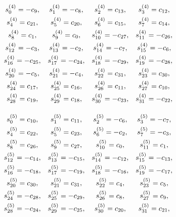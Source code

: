 \documentclass{jtacs}
\numberwithin{equation}{section}
\begin{document}
\begin{center}
\begin{adjustbox}{width=0.57\textwidth, margin=0 0 0 0}
$
\begin{array}{cccc}
\renewcommand*{\arraystretch}{1.5}
\begin{matrix}

s_{0}^{(4)}=-c_{9}, & 	s_{1}^{(4)}=-c_{8}, & 	s_{2}^{(4)}=c_{13}, & 	s_{3}^{(4)}=c_{12}, \\ 	s_{4}^{(4)}=c_{21}, & 	s_{5}^{(4)}=c_{20}, & 	s_{6}^{(4)}=c_{15}, & 	s_{7}^{(4)}=c_{14}, \\
s_{8}^{(4)}=c_{1}, & 	s_{9}^{(4)}=c_{0}, & 	s_{10}^{(4)}=-c_{27}, & 	s_{11}^{(4)}=-c_{26}, \\
s_{12}^{(4)}=-c_{3}, & 	s_{13}^{(4)}=-c_{2}, & 	s_{14}^{(4)}=-c_{7}, & 	s_{15}^{(4)}=-c_{6}, \\
s_{16}^{(4)}=-c_{25}, & 	s_{17}^{(4)}=-c_{24}, & 	s_{18}^{(4)}=-c_{29}, & 	s_{19}^{(4)}=-c_{28}, \\
s_{20}^{(4)}=-c_{5}, & 	s_{21}^{(4)}=-c_{4}, & 	s_{22}^{(4)}=c_{31}, & 	s_{23}^{(4)}=c_{30}, \\
s_{24}^{(4)}=c_{17}, & 	s_{25}^{(4)}=c_{16}, & 	s_{26}^{(4)}=c_{11}, & 	s_{27}^{(4)}=c_{10}, \\ 	s_{28}^{(4)}=c_{19}, & 	s_{29}^{(4)}=c_{18}, & 	s_{30}^{(4)}=-c_{23}, & 	s_{31}^{(4)}=-c_{22}, \\
\end{matrix}
\end{array}
$
\end{adjustbox}
\end{center}

\begin{center}
\begin{adjustbox}{width=0.57\textwidth, margin=0 0 0 0}
$
\begin{array}{cccc}
\renewcommand*{\arraystretch}{1.5}
\begin{matrix}
s_{0}^{(5)}=c_{10}, & 	s_{1}^{(5)}=c_{11}, & 	s_{2}^{(5)}=-c_{6}, & 	s_{3}^{(5)}=-c_{7}, \\ 	s_{4}^{(5)}=c_{22}, & 	s_{5}^{(5)}=c_{23}, & 	s_{6}^{(5)}=-c_{2}, & 	s_{7}^{(5)}=-c_{3}, \\
s_{8}^{(5)}=c_{26}, & 	s_{9}^{(5)}=c_{27}, & 	s_{10}^{(5)}=c_{0}, & 	s_{11}^{(5)}=c_{1}, \\
s_{12}^{(5)}=-c_{14}, & 	s_{13}^{(5)}=-c_{15}, & 	s_{14}^{(5)}=-c_{12}, & 	s_{15}^{(5)}=-c_{13}, \\
s_{16}^{(5)}=-c_{18}, & 	s_{17}^{(5)}=-c_{19}, & 	s_{18}^{(5)}=-c_{16}, & 	s_{19}^{(5)}=-c_{17}, \\ 	s_{20}^{(5)}=c_{30}, & 	s_{21}^{(5)}=c_{31}, & 	s_{22}^{(5)}=c_{4}, & 	s_{23}^{(5)}=c_{5}, \\
s_{24}^{(5)}=-c_{28}, & 	s_{25}^{(5)}=-c_{29}, & 	s_{26}^{(5)}=c_{8}, & 	s_{27}^{(5)}=c_{9}, \\
s_{28}^{(5)}=-c_{24}, & 	s_{29}^{(5)}=-c_{25}, & 	s_{30}^{(5)}=c_{20}, & 	s_{31}^{(5)}=c_{21}, \\
\end{matrix}
\end{array}
$
\end{adjustbox}
\end{center}
\end{document}
